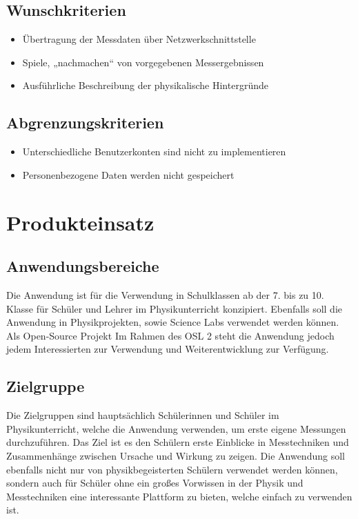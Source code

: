 \documentclass[parskip=full]{scrartcl}
\begin{document}
\subsection{Wunschkriterien}

\begin{itemize}

\item Übertragung der Messdaten über Netzwerkschnittstelle
\item Spiele, „nachmachen“ von vorgegebenen Messergebnissen
\item Ausführliche Beschreibung der physikalische Hintergründe

 \end{itemize}

\subsection{Abgrenzungskriterien}

\begin{itemize}

\item Unterschiedliche Benutzerkonten sind nicht zu implementieren
\item Personenbezogene Daten werden nicht gespeichert

 \end{itemize}

\section{Produkteinsatz}

\subsection{Anwendungsbereiche}

Die Anwendung ist für die Verwendung in Schulklassen ab der 7. bis zu 10. Klasse für Schüler und Lehrer im Physikunterricht konzipiert. Ebenfalls soll die Anwendung in Physikprojekten, sowie \gls{Science Labs} verwendet werden können. 
Als \gls{Open-Source Projekt} Im Rahmen des \gls{OSL 2} steht die Anwendung jedoch jedem Interessierten zur Verwendung und Weiterentwicklung zur Verfügung.


\subsection{Zielgruppe}

Die Zielgruppen sind hauptsächlich Schülerinnen und Schüler im Physikunterricht, welche die Anwendung verwenden, um erste eigene Messungen durchzuführen. Das Ziel ist es den Schülern erste Einblicke in Messtechniken und Zusammenhänge zwischen Ursache und Wirkung zu zeigen. 
Die Anwendung soll ebenfalls nicht nur von physikbegeisterten Schülern verwendet werden können, sondern auch für Schüler ohne ein großes Vorwissen in der Physik und Messtechniken eine interessante Plattform zu bieten, welche einfach zu verwenden ist.
\end{document}
